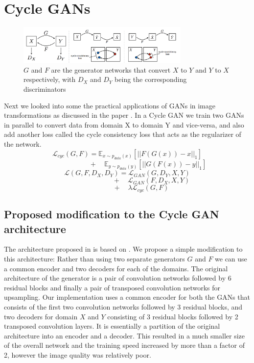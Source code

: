 \documentclass{article}
\begin{document}
\section{Cycle GANs}
\label{Cycle GAN}
\begin{figure}[h!]
        \includegraphics[width=8.5cm]{Cycle_GAN_idea.png}
        \caption{ $G$ and $F$ are the generator networks that convert $X$ to $Y$ and $Y$ to $X$ respectively, with $D_X$ and $D_Y$ being the corresponding discriminators}
        \label{fig:2}
\end{figure}
Next we looked into some the practical applications of GANs in image transformations as discussed in the paper \cite{cyclegan}.\newline
In a Cycle GAN we train two GANs in parallel to convert data from domain X to domain Y and vice-versa, and also add another loss called the cycle consistency loss that acts as the regularizer of the network.
\[\mathcal{L}_{cyc}(G,F)=\mathbb{E}_{x\sim p_{data}(x)}[||F(G(x)) - x||_1]\]
\[\quad\quad\quad\quad\quad\quad+\quad\mathbb{E}_{y\sim p_{data}(y)}[||G(F(x)) - y||_1]\]
\[\mathcal{L}(G,F,D_X,D_Y) = \mathcal{L}_{GAN}(G,D_Y,X,Y)\]
\[\quad\quad\quad\quad\quad\quad\quad+\quad\mathcal{L}_{GAN}(F,D_X,X,Y)\]
\[\quad\quad\quad\quad+\quad\lambda\mathcal{L}_{cyc}(G,F)\]

\subsection{Proposed modification to the Cycle GAN architecture}
\label{propsed modification to cycle GAN architecture}
The architecture proposed in \cite{cyclegan} is based on \cite{perceptual_loss}. We propose a simple modification to this architecture: \newline
Rather than using two separate generators $G$ and $F$ we can use a common encoder and two decoders for each of the domains. The original architecture of the generator is a pair of convolution networks followed by 6 residual blocks and finally a pair of transposed convolution networks for upsampling. Our implementation uses a common encoder for both the GANs that consists of the first two convolution networks followed by 3 residual blocks, and two decoders for domain $X$ and $Y$ consisting of 3 residual blocks followed by 2 transposed convolution layers. It is essentially a partition of the original architecture into an encoder and a decoder.\newline
This resulted in a much smaller size of the overall network and the training speed increased by more than a factor of 2, however the image quality was relatively poor.
\end{document}
